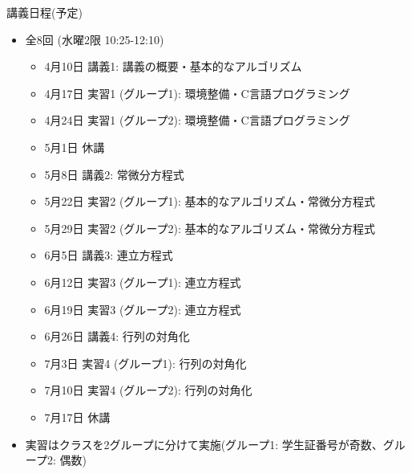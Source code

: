 \begin{frame}[t]{講義日程(予定)}
  \begin{itemize}
  \item 全8回 (水曜2限 10:25-12:10)
    \begin{itemize}
    \item 4月10日 講義1: 講義の概要・基本的なアルゴリズム
    \item 4月17日 実習1 (グループ1): 環境整備・C言語プログラミング
    \item 4月24日 実習1 (グループ2): 環境整備・C言語プログラミング
    \item {\color{gray} 5月1日 休講}
    \item 5月8日 講義2: 常微分方程式
    \item 5月22日 実習2 (グループ1): 基本的なアルゴリズム・常微分方程式
    \item 5月29日 実習2 (グループ2): 基本的なアルゴリズム・常微分方程式
    \item 6月5日 講義3: 連立方程式
    \item 6月12日 実習3 (グループ1): 連立方程式
    \item 6月19日 実習3 (グループ2): 連立方程式
    \item 6月26日 講義4: 行列の対角化
    \item 7月3日 実習4 (グループ1): 行列の対角化
    \item 7月10日 実習4 (グループ2): 行列の対角化
    \item {\color{gray} 7月17日 休講}
    \end{itemize}
  \item 実習はクラスを2グループに分けて実施(グループ1: 学生証番号が奇数、グループ2: 偶数)
  \end{itemize}
\end{frame}

